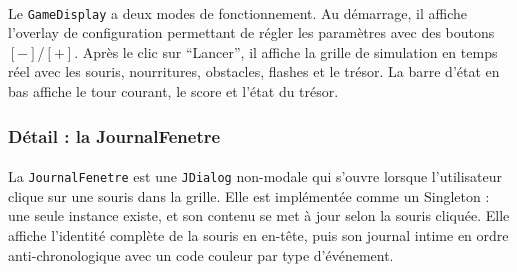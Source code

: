 \paragraph{} Le \texttt{GameDisplay} a deux modes de fonctionnement. Au démarrage, il affiche l'overlay de configuration permettant de régler les paramètres avec des boutons $[-]$/$[+]$. Après le clic sur ``Lancer'', il affiche la grille de simulation en temps réel avec les souris, nourritures, obstacles, flashes et le trésor. La barre d'état en bas affiche le tour courant, le score et l'état du trésor.

\bigskip

\subsubsection{Détail : la JournalFenetre}

\paragraph{} La \texttt{JournalFenetre} est une \texttt{JDialog} non-modale qui s'ouvre lorsque l'utilisateur clique sur une souris dans la grille. Elle est implémentée comme un Singleton : une seule instance existe, et son contenu se met à jour selon la souris cliquée. Elle affiche l'identité complète de la souris en en-tête, puis son journal intime en ordre anti-chronologique avec un code couleur par type d'événement.

